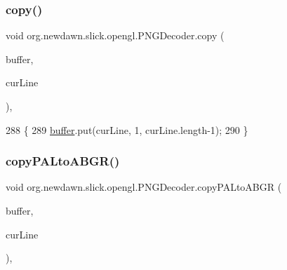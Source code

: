 \subsubsection{\texorpdfstring{copy()}{copy()}}
{\footnotesize\ttfamily void org.\+newdawn.\+slick.\+opengl.\+P\+N\+G\+Decoder.\+copy (\begin{DoxyParamCaption}\item[{Byte\+Buffer}]{buffer,  }\item[{byte \mbox{[}$\,$\mbox{]}}]{cur\+Line }\end{DoxyParamCaption})\hspace{0.3cm}{\ttfamily [inline]}, {\ttfamily [private]}}


\begin{DoxyCode}
288                                                          \{
289         \mbox{\hyperlink{classorg_1_1newdawn_1_1slick_1_1opengl_1_1_p_n_g_decoder_ae205f9222586a2bc01a8a240c5c210ad}{buffer}}.put(curLine, 1, curLine.length-1);
290     \}
\end{DoxyCode}
\mbox{\label{classorg_1_1newdawn_1_1slick_1_1opengl_1_1_p_n_g_decoder_af953ec84436cf0d1f6f01ccb06f0a7c6}} 
\subsubsection{\texorpdfstring{copy\+P\+A\+Lto\+A\+B\+G\+R()}{copyPALtoABGR()}}
{\footnotesize\ttfamily void org.\+newdawn.\+slick.\+opengl.\+P\+N\+G\+Decoder.\+copy\+P\+A\+Lto\+A\+B\+GR (\begin{DoxyParamCaption}\item[{Byte\+Buffer}]{buffer,  }\item[{byte \mbox{[}$\,$\mbox{]}}]{cur\+Line }\end{DoxyParamCaption})\hspace{0.3cm}{\ttfamily [inline]}, {\ttfamily [private]}}


